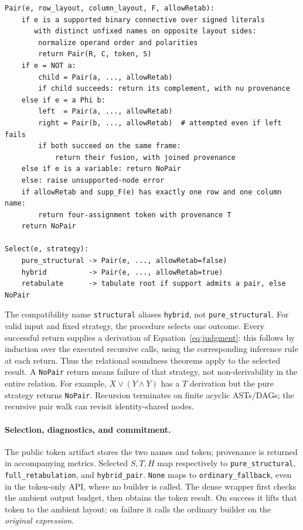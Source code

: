 \documentclass[10pt]{article}
\theoremstyle{plain}
\theoremstyle{definition}
\theoremstyle{remark}
\begin{document}
\begin{lstlisting}
Pair(e, row_layout, column_layout, F, allowRetab):
    if e is a supported binary connective over signed literals
       with distinct unfixed names on opposite layout sides:
        normalize operand order and polarities
        return Pair(R, C, token, S)
    if e = NOT a:
        child = Pair(a, ..., allowRetab)
        if child succeeds: return its complement, with nu provenance
    else if e = a Phi b:
        left  = Pair(a, ..., allowRetab)
        right = Pair(b, ..., allowRetab)  # attempted even if left fails
        if both succeed on the same frame:
            return their fusion, with joined provenance
    else if e is a variable: return NoPair
    else: raise unsupported-node error
    if allowRetab and supp_F(e) has exactly one row and one column name:
        return four-assignment token with provenance T
    return NoPair

Select(e, strategy):
    pure_structural -> Pair(e, ..., allowRetab=false)
    hybrid          -> Pair(e, ..., allowRetab=true)
    retabulate      -> tabulate root if support admits a pair, else NoPair
\end{lstlisting}

The compatibility name \texttt{structural} aliases \texttt{hybrid}, not \texttt{pure\_structural}. For valid input and fixed strategy, the procedure selects one outcome. Every successful return supplies a derivation of Equation~\eqref{eq:judgment}: this follows by induction over the executed recursive calls, using the corresponding inference rule at each return. Thus the relational soundness theorems apply to the selected result. A \texttt{NoPair} return means failure of that strategy, not non-derivability in the entire relation. For example, $X\lor(Y\land Y)$ has a $T$ derivation but the pure strategy returns \texttt{NoPair}. Recursion terminates on finite acyclic ASTs/DAGs; the recursive pair walk can revisit identity-shared nodes.

\paragraph{Selection, diagnostics, and commitment.}
The public token artifact stores the two names and token; provenance is returned in accompanying metrics. Selected $S,T,H$ map respectively to \texttt{pure\_structural}, \texttt{full\_retabulation}, and \texttt{hybrid\_pair}. \texttt{None} maps to \texttt{ordinary\_fallback}, even in the token-only API, where no builder is called. The dense wrapper first checks the ambient output budget, then obtains the token result. On success it lifts that token to the ambient layout; on failure it calls the ordinary builder on the \emph{original expression}.
\end{document}
